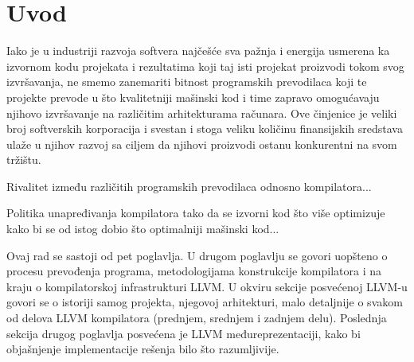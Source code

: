 \documentclass[12pt,oneside]{memoir}
\begin{document}
\frontmatter
\naslovna
\komisija
\apstrakt
\tableofcontents*

\mainmatter

\chapter{Uvod}
Iako je u industriji razvoja softvera najčešće sva pažnja i energija usmerena 
ka izvornom kodu projekata i rezultatima koji taj isti projekat proizvodi tokom 
svog izvršavanja, ne smemo zanemariti bitnost programskih prevodilaca koji te projekte prevode u što kvalitetniji mašinski kod i time zapravo omogućavaju njihovo izvršavanje na različitim arhitekturama računara. Ove činjenice je veliki broj softverskih korporacija i svestan i stoga veliku količinu finansijskih sredstava ulaže u njihov razvoj sa ciljem da njihovi proizvodi ostanu konkurentni na svom tržištu.

Rivalitet između različitih programskih prevodilaca odnosno kompilatora...

Politika unapređivanja kompilatora tako da se izvorni kod što više optimizuje kako bi se od istog dobio što optimalniji mašinski kod...

Ovaj rad se sastoji od pet poglavlja. U drugom poglavlju se govori uopšteno o procesu prevođenja programa, metodologijama konstrukcije kompilatora i na kraju o kompilatorskoj infrastrukturi LLVM.
U okviru sekcije posvećenoj LLVM-u govori se o istoriji samog projekta, njegovoj arhitekturi, malo detaljnije o svakom od delova LLVM kompilatora (prednjem, srednjem i zadnjem delu). Poslednja sekcija drugog poglavlja posvećena je LLVM međureprezentaciji, kako bi objašnjenje 
implementacije rešenja bilo što razumljivije.
\end{document}
